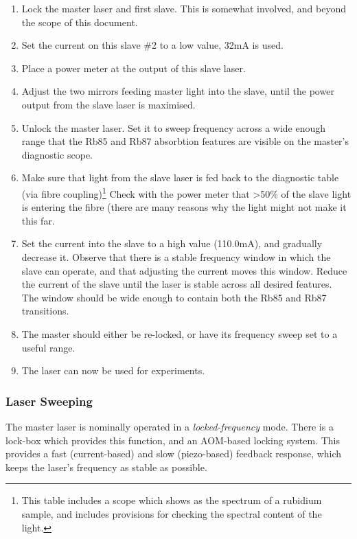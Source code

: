 \begin{enumerate}
 \item Lock the master laser and first slave.  This is somewhat involved, and beyond the scope of this document.
 \item Set the current on this slave \#2 to a low value, 32mA is used.
 \item Place a power meter at the output of this slave laser.
 \item Adjust the two mirrors feeding master light into the slave, until the power output from the slave laser is maximised.
 \item Unlock the master laser.  Set it to sweep frequency across a wide enough range that the Rb85 and Rb87 absorbtion features are visible on the master's diagnostic scope.
 \item Make sure that light from the slave laser is fed back to the diagnostic table (via fibre coupling)\footnote{This table includes a scope which shows as the spectrum of a rubidium sample, and includes provisions for checking the spectral content of the light.}  Check with the power meter that >50\% of the slave light is entering the fibre (there are many reasons why the light might not make it this far.
 \item Set the current into the slave to a high value (110.0mA), and gradually decrease it.  Observe that there is a stable frequency window in which the slave can operate, and that adjusting the current moves this window.  Reduce the current of the slave until the laser is stable across all desired features.  The window should be wide enough to contain both the Rb85 and Rb87 transitions.
 \item The master should either be re-locked, or have its frequency sweep set to a useful range.
 \item The laser can now be used for experiments.
\end{enumerate}

    \subsubsection{Laser Sweeping}

The master laser is nominally operated in a \emph{locked-frequency} mode.  There is a lock-box which provides this function, and an AOM-based locking system.  This provides a fast (current-based) and slow (piezo-based) feedback response, which keeps the laser's frequency as stable as possible.

